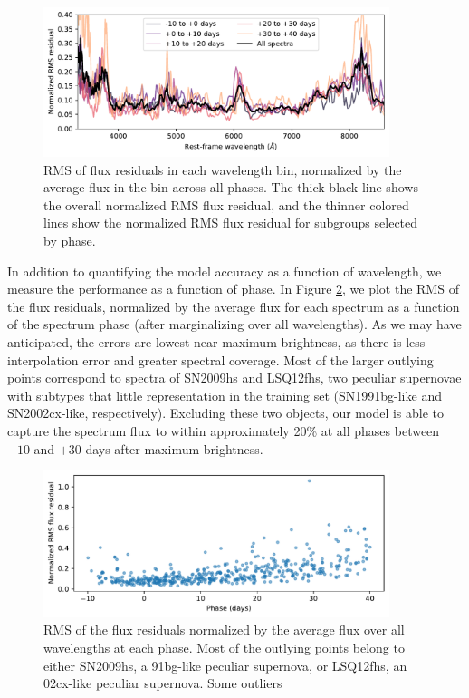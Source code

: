 \begin{figure}
    \centering
\includegraphics[width=0.9\textwidth]{figures/nn_twins/embed2spec_rms_wavelength.pdf}
    \caption{RMS of \etos{} flux residuals in each wavelength bin, normalized by the average flux in the bin across all phases. The thick black line shows the overall normalized RMS flux residual, and the thinner colored lines show the normalized RMS flux residual for subgroups selected by phase.}
    \label{fig:e2s_wavelength_resids}
\end{figure}

In addition to quantifying the model accuracy as a function of wavelength, we measure the performance as a function of phase. In Figure \ref{fig:e2s_phase_resids}, we plot the RMS of the flux residuals, normalized by the average flux for each spectrum as a function of the spectrum phase (after marginalizing over all wavelengths). As we may have anticipated, the errors are lowest near-maximum brightness, as there is less interpolation error and greater spectral coverage. Most of the larger outlying points correspond to spectra of SN2009hs and LSQ12fhs, two peculiar supernovae with subtypes that little representation in the training set (SN1991bg-like and SN2002cx-like, respectively). Excluding these two objects, our model is able to capture the spectrum flux to within approximately 20\% at all phases between $-10$ and $+30$ days after maximum brightness.

\begin{figure}
    \centering
    \includegraphics[width=0.9\textwidth]{figures/nn_twins/embed2spec_rms_phase.pdf}
    \caption{RMS of the flux residuals normalized by the average flux over all wavelengths at each phase. Most of the outlying points belong to either SN2009hs, a 91bg-like peculiar supernova, or LSQ12fhs, an 02cx-like peculiar supernova. Some outliers}
    \label{fig:e2s_phase_resids}
\end{figure}

